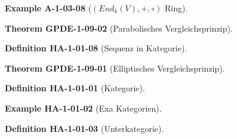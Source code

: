 \documentclass[10pt, letterpaper]{article}
\newcommand{\CustomHeading}[3]{%
  \par\medskip\noindent%
  \textbf{#1 #2} \textnormal{(#3)}.\enskip%
}
\newenvironment{DEF}[2]{\CustomHeading{Definition}{#1}{#2}}{}
\newenvironment{THEO}[2]{\CustomHeading{Theorem}{#1}{#2}}{}
\newenvironment{EXA}[2]{\CustomHeading{Example}{#1}{#2}}{}
\begin{document}

\begin{EXA}{A-1-03-08}{$(End_k(V),+,\circ)$ Ring}
\end{EXA}


\begin{THEO}{GPDE-1-09-02}{Parabolisches Vergleichsprinzip}
\end{THEO}


\begin{DEF}{HA-1-01-08}{Sequenz in Kategorie}
\end{DEF}


\begin{THEO}{GPDE-1-09-01}{Elliptisches Vergleichsprinzip}
\end{THEO}


\begin{DEF}{HA-1-01-01}{Kategorie}
\end{DEF}


\begin{EXA}{HA-1-01-02}{Exa Kategorien}
\end{EXA}


\begin{DEF}{HA-1-01-03}{Unterkategorie}
\end{DEF}
\end{document}
